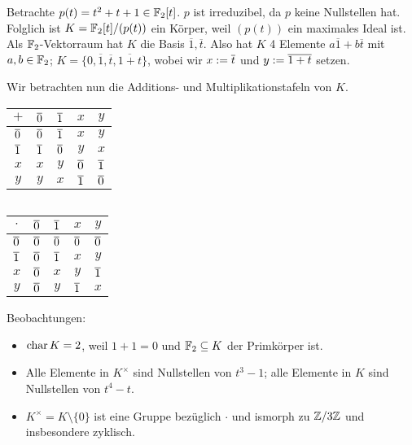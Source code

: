 \documentclass[12pt,a4paper]{scrartcl}
\begin{document}
\begin{bsp}
	Betrachte $p(t) = t^2+t+1\in \mathbb F_2[t]$. $p$ ist irreduzibel, da $p$ keine Nullstellen hat. Folglich ist $K = \mathbb F_2[t]/(p(t))$ ein Körper, weil $(p(t))$ ein maximales Ideal ist. Als $\mathbb F_2$-Vektorraum hat $K$ die Basis $\overline{1}, \overline{t}$. Also hat $K$ 4 Elemente $a\overline{1}+b\overline{t}$ mit $a,b\in \mathbb F_2$; $K = \{0,\overline{ 1},\overline{ t}, \overline{1+t}\}$, wobei wir $x := \overline t$ und $y := \overline{1+t}$ setzen.
	
	Wir betrachten nun die Additions- und Multiplikationstafeln von $K$.
	\begin{center}
		\begin{tabular}{c||c|c|c|c}
			$+$ & $\overline 0$ & $\overline 1$ & $x$ & $y$  \\
			\hline \hline
			$\overline 0$ & $\overline 0$ & $\overline 1$ & $x$ & $y$ \\
			\hline
			$\overline 1$ & $\overline 1$ & $\overline 0$ & $y$ & $x$ \\
			\hline
			$x$ & $x$ & $y$ & $\overline 0$ & $\overline 1$ \\
			\hline
			$y$ & $y$ & $x$ & $\overline 1$ & $\overline 0$ \\
		\end{tabular} $\qquad$
		\begin{tabular}{c||c|c|c|c}
			$\cdot$ & $\overline 0$ & $\overline 1$ & $x$ & $y$  \\
			\hline \hline
			$\overline 0$ & $\overline 0$ & $\overline 0$ & $\overline 0$ & $\overline 0$ \\
			\hline
			$\overline 1$ & $\overline 0$ & $\overline 1$ & $x$ & $y$ \\
			\hline
			$x$ & $\overline 0$ & $x$ & $y$ & $\overline 1$ \\
			\hline
			$y$ & $\overline 0$ & $y$ & $\overline 1$ & $x$ \\
		\end{tabular}
	\end{center}
	
	\noindent Beobachtungen:
	\begin{itemize}
		\item $\operatorname{char}{K} = 2$, weil $1+1 = 0$ und $\mathbb F_2\subseteq K$ der Primkörper ist.
		\item Alle Elemente in $K^{\times}$ sind Nullstellen von $t^3-1$; alle Elemente in $K$ sind Nullstellen von $t^4 -t$.
		\item $K^{\times} = K\setminus \{0\}$ ist eine Gruppe bezüglich $\cdot$ und ismorph zu $\mathbb Z/3\mathbb Z$ und insbesondere zyklisch.
	\end{itemize}
\end{bsp}
\end{document}
